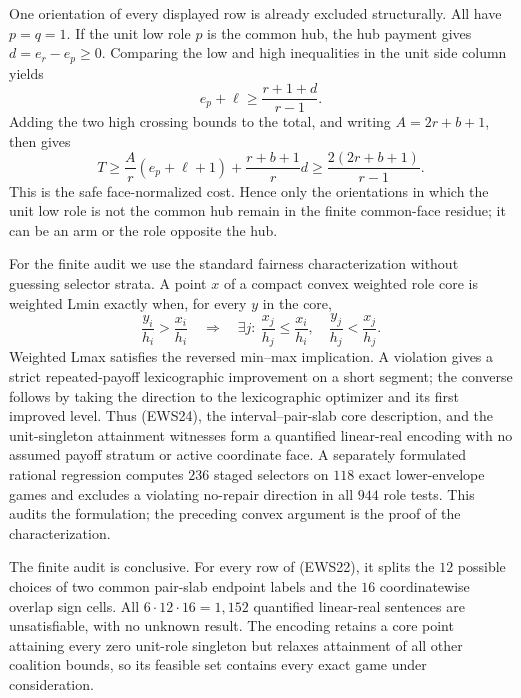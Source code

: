 \documentclass[11pt]{article}
\begin{document}
One orientation of every displayed row is already excluded structurally.
All have $p=q=1$.  If the unit low role $p$ is the common hub, the hub payment
gives $d=e_r-e_p\geq0$.  Comparing the low and high inequalities in the unit
side column yields
\[
 e_p+\ell\geq\frac{r+1+d}{r-1}.
\]
Adding the two high crossing bounds to the total, and writing
$A=2r+b+1$, then gives
\begin{equation}
 T\geq\frac Ar(e_p+\ell+1)+\frac{r+b+1}{r}d
 \geq\frac{2(2r+b+1)}{r-1}.                            \tag{EWS23}
\end{equation}
This is the safe face-normalized cost.  Hence only the orientations in which
the unit low role is not the common hub remain in the finite common-face
residue; it can be an arm or the role opposite the hub.

For the finite audit we use the standard fairness characterization without
guessing selector strata.  A point $x$ of a compact convex weighted role
core is weighted Lmin exactly when, for every $y$ in the core,
\begin{equation}
 \frac{y_i}{h_i}>\frac{x_i}{h_i}\quad\Longrightarrow\quad
 \exists j:\ \frac{x_j}{h_j}\leq\frac{x_i}{h_i},\quad
 \frac{y_j}{h_j}<\frac{x_j}{h_j}.                       \tag{EWS24}
\end{equation}
Weighted Lmax satisfies the reversed min--max implication.  A violation
gives a strict repeated-payoff lexicographic improvement on a short segment;
the converse follows by taking the direction to the lexicographic optimizer
and its first improved level.  Thus (EWS24), the interval--pair-slab core
description, and the unit-singleton attainment witnesses form a quantified
linear-real encoding with no assumed payoff stratum or active coordinate
face.  A separately formulated rational regression computes $236$ staged
selectors on $118$ exact lower-envelope games and excludes a violating
no-repair direction in all $944$ role tests.  This audits the formulation;
the preceding convex argument is the proof of the characterization.

The finite audit is conclusive.  For every row of (EWS22), it splits the
$12$ possible choices of two common pair-slab endpoint labels and the $16$
coordinatewise overlap sign cells.  All $6\cdot12\cdot16=1{,}152$
quantified linear-real sentences are unsatisfiable, with no unknown result.
The encoding retains a core point attaining every zero unit-role singleton
but relaxes attainment of all other coalition bounds, so its feasible set
contains every exact game under consideration.
\end{document}

